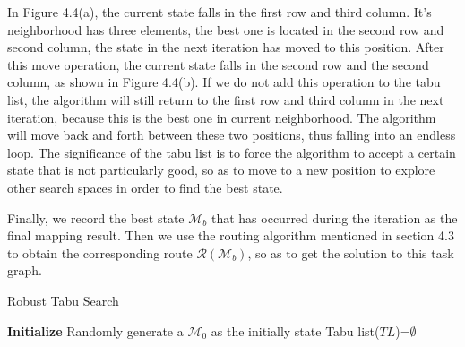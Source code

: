 In Figure 4.4(a), the current state falls in the first row and third column. It's neighborhood has three elements, the best one is located in the second row and second column, the state in the next iteration has moved to this position. After this move operation, the current state falls in the second row and the second column, as shown in Figure 4.4(b). If we do not add this operation to the tabu list, the algorithm will still return to the first row and third column in the next iteration, because this is the best one in current neighborhood. The algorithm will move back and forth between these two positions, thus falling into an endless loop. The significance of the tabu list is to force the algorithm to accept a certain state that is not particularly good, so as to move to a new position to explore other search spaces in order to find the best state.

Finally, we record the best state $\mathcal{M}_b$ that has occurred during the iteration as the final mapping result. Then we use the routing algorithm mentioned in section 4.3 to obtain the corresponding route $\mathcal{R}(\mathcal{M}_b)$, so as to get the solution to this task graph.

\begin{algorithm}
    \caption{Robust Tabu Search}
    \LinesNumbered
    \textbf{Initialize} {Randomly generate a $\mathcal{M}_0$ as the initially state \newline
    Tabu list($TL$)=$\emptyset$} \\
\end{algorithm}

